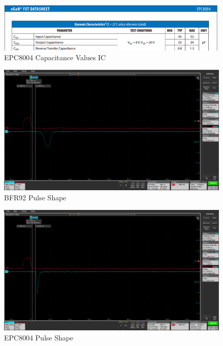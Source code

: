 \documentclass[a4paper,11pt]{article}
\begin{document}
\begin{figure}[htbp]
\centering
\includegraphics[scale=0.8]{EPC8004Cap.png}
\caption{EPC8004 Capacitance Values IC\label{fig:EPC8004Cap}}
\end{figure}

\begin{figure}[htbp]
\centering
\includegraphics[scale=0.3]{bfr92st310nh_000.png}
\caption{BFR92 Pulse Shape\label{fig:BFR92PulseShape}}
\end{figure}

\begin{figure}[htbp]
\centering
\includegraphics[scale=0.3]{800420nh47pf_000.png}
\caption{EPC8004 Pulse Shape\label{fig:EPC8004PulseShape}}
\end{figure}
\end{document}
